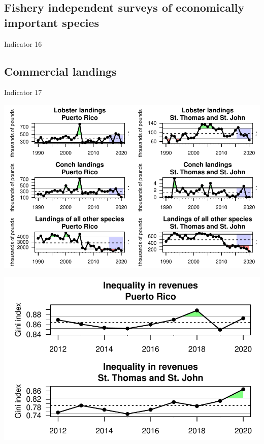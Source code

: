 \documentclass[
  letterpaper,
  oneside,
  open=any]{scrbook}
\begin{document}
\subsection{Fishery independent surveys of economically important
species}\label{fishery-independent-surveys-of-economically-important-species}

Indicator 16

\subsection{Commercial landings}\label{commercial-landings}

Indicator 17

\includegraphics{Report_book_files/Performance_indicators_files/figure-pdf/unnamed-chunk-2-1.pdf}

\includegraphics{Report_book_files/Performance_indicators_files/figure-pdf/unnamed-chunk-3-1.pdf}
\end{document}
